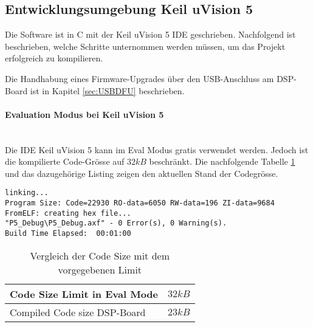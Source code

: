 \subsection{Entwicklungsumgebung Keil uVision 5}
\label{sec:IDE}

Die Software ist in C mit der Keil uVision 5 IDE geschrieben. Nachfolgend ist beschrieben, welche Schritte unternommen werden müssen, um das Projekt erfolgreich zu kompilieren.

Die Handhabung eines Firmware-Upgrades über den USB-Anschluss am DSP-Board ist in Kapitel \ref{sec:USBDFU} beschrieben.
\\
\paragraph{Evaluation Modus bei Keil uVision 5}\vspace{-0.3cm}\\
Die IDE Keil uVision 5 kann im Eval Modus gratis verwendet werden.
Jedoch ist die kompilierte Code-Grösse auf $32\si{kB}$ beschränkt.
Die nachfolgende Tabelle \ref{tab:codesize} und das dazugehörige Listing zeigen den aktuellen Stand der Codegrösse.\\

\begin{lstlisting}[caption={Build Output beim Kompilieren der Software}]
linking...
Program Size: Code=22930 RO-data=6050 RW-data=196 ZI-data=9684  
FromELF: creating hex file...
"P5_Debug\P5_Debug.axf" - 0 Error(s), 0 Warning(s).
Build Time Elapsed:  00:01:00
\end{lstlisting}

\begin{table}[H]
	\centering
	\begin{tabular}{|l|l|}
		\hline
		Code Size Limit in Eval Mode & $32\si{kB}$ \\ \hline
		Compiled Code size DSP-Board & $23\si{kB}$ \\ \hline
	\end{tabular}
	\caption{Vergleich der Code Size mit dem vorgegebenen Limit}
	\label{tab:codesize}
\end{table}

